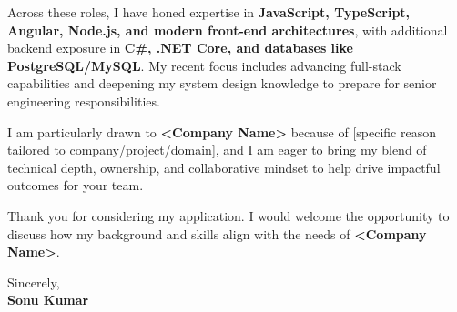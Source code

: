 \documentclass[11pt,a4paper]{article}
\newcommand{\Company}{<Company Name>}
\begin{document}
Across these roles, I have honed expertise in \textbf{JavaScript, TypeScript, Angular, Node.js, and modern front-end architectures}, with additional backend exposure in \textbf{C\#, .NET Core, and databases like PostgreSQL/MySQL}. My recent focus includes advancing full-stack capabilities and deepening my system design knowledge to prepare for senior engineering responsibilities.  

I am particularly drawn to \textbf{\Company} because of [specific reason tailored to company/project/domain], and I am eager to bring my blend of technical depth, ownership, and collaborative mindset to help drive impactful outcomes for your team.  

Thank you for considering my application. I would welcome the opportunity to discuss how my background and skills align with the needs of \textbf{\Company}.  

\vspace{0.7cm}
\noindent Sincerely, \\
\textbf{Sonu Kumar}  
\end{document}
